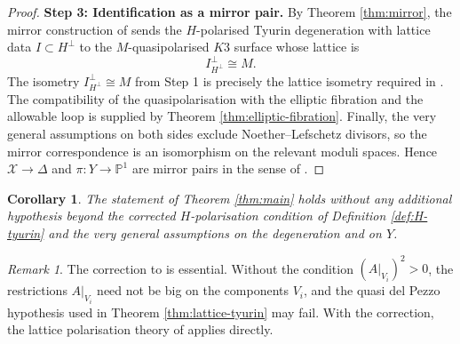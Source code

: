 \documentclass[11pt]{amsart}
\newtheorem{corollary}[theorem]{Corollary}
\theoremstyle{definition}
\theoremstyle{remark}
\newtheorem{remark}[theorem]{Remark}
\begin{document}
\begin{proof}
\medskip
\noindent\textbf{Step 3: Identification as a mirror pair.}
By Theorem \ref{thm:mirror}, the mirror construction of \cite[Section 5]{GT24}
sends the \(H\)-polarised Tyurin degeneration with lattice data
\(I\subset H^\perp\) to the \(M\)-quasipolarised \(K3\) surface whose lattice is
\[
I^\perp_{H^\perp}\cong M.
\]
The isometry \(I^\perp_{H^\perp}\cong M\) from Step 1 is precisely the lattice
isometry required in \cite[Definition 5.1]{GT24}.  The compatibility of the
quasipolarisation with the elliptic fibration and the allowable loop is supplied
by Theorem \ref{thm:elliptic-fibration}.  Finally, the very general assumptions
on both sides exclude Noether--Lefschetz divisors, so the mirror correspondence
is an isomorphism on the relevant moduli spaces.  Hence
\(\mathcal X\to\Delta\) and \(\pi\colon Y\to\mathbb P^1\) are mirror pairs in the
sense of \cite[Definition 5.1]{GT24}.
\end{proof}

\begin{corollary}
The statement of Theorem \ref{thm:main} holds without any additional
hypothesis beyond the corrected \(H\)-polarisation condition of Definition
\ref{def:H-tyurin} and the very general assumptions on the degeneration and on
\(Y\).
\end{corollary}

\begin{remark}
The correction to \cite[Definition 3.20]{GT24} is essential.  Without the
condition \((A|_{V_i})^2>0\), the restrictions \(A|_{V_i}\) need not be big on
the components \(V_i\), and the quasi del Pezzo hypothesis used in
Theorem \ref{thm:lattice-tyurin} may fail.  With the correction, the lattice
polarisation theory of \cite[Theorems 3.26 and 3.28]{GT24} applies directly.
\end{remark}
\end{document}
